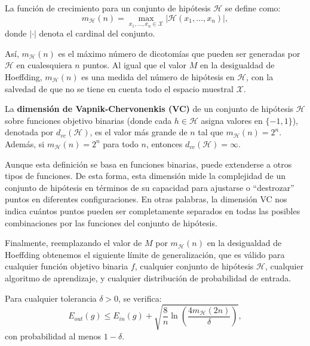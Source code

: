 \begin{definicion}
    La función de crecimiento para un conjunto de hipótesis $\mathcal{H}$ se define como:
    \[
        m_{\mathcal{H}}(n) = \max_{x_1, \ldots, x_n \in \mathcal{X}} |\mathcal{H}(x_1, \ldots, x_n)|,
    \]
    donde $|\cdot|$ denota el cardinal del conjunto.
\end{definicion}

Así, $m_{\mathcal{H}}(n)$ es el máximo número de dicotomías que pueden ser generadas por $\mathcal{H}$ en cualesquiera $n$ puntos. Al igual que el valor $M$ en la desigualdad de Hoeffding, $m_{\mathcal{H}}(n)$ es una medida del número de hipótesis en $\mathcal{H}$, con la salvedad de que no se tiene en cuenta todo el espacio muestral $\mathcal{X}$.

\begin{definicion}[Dimensión VC]
    La \textbf{dimensión de Vapnik-Chervonenkis (VC)} de un conjunto de hipótesis $\mathcal{H}$ sobre funciones objetivo binarias (donde cada $h \in \mathcal{H}$ asigna valores en $\{-1, 1\}$), denotada por $d_{vc}(\mathcal{H})$, es el valor más grande de $n$ tal que $m_{\mathcal{H}}(n) = 2^n$. Además, si $m_{\mathcal{H}}(n) = 2^n$ para todo $n$, entonces $d_{vc}(\mathcal{H}) = \infty$.
\end{definicion}

Aunque esta definición se basa en funciones binarias, puede extenderse a otros tipos de funciones. De esta forma, esta dimensión mide la complejidad de un conjunto de hipótesis en términos de su capacidad para ajustarse o ``destrozar'' puntos en diferentes configuraciones. En otras palabras, la dimensión VC nos indica cuántos puntos pueden ser completamente separados en todas las posibles combinaciones por las funciones del conjunto de hipótesis.

Finalmente, reemplazando el valor de $M $ por $m_{\mathcal{H}}(n)$ en la desigualdad de Hoeffding obtenemos el siguiente límite de generalización, que es válido para cualquier función objetivo binaria $f$, cualquier conjunto de hipótesis $\mathcal{H}$, cualquier algoritmo de aprendizaje, y cualquier distribución de probabilidad de entrada.

\begin{teorema}\label{teo:limite-VC}
    Para cualquier tolerancia $ \delta > 0 $, se verifica:
    \[
        E_{out}(g) \leq E_{in}(g) + \sqrt{\frac{8}{n} \ln \left( \frac{4 m_{\mathcal{H}}(2n)}{\delta} \right) },
    \]
    con probabilidad al menos $ 1 - \delta $.
\end{teorema}

